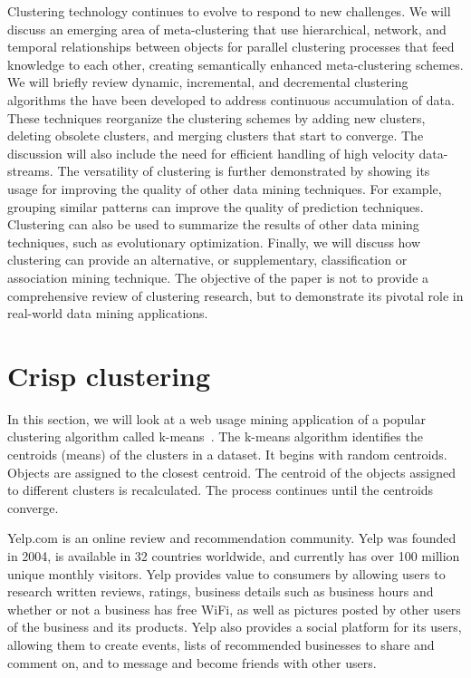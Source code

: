 \documentclass[oribibl]{llncs}
\begin{document}
Clustering technology continues to evolve to respond to new challenges. We will discuss an emerging area of meta-clustering that use hierarchical, network, and temporal relationships between objects for parallel clustering processes that feed knowledge to each other, creating semantically enhanced meta-clustering schemes. We will briefly review dynamic, incremental, and decremental clustering algorithms the have been developed to address continuous accumulation of data. These techniques reorganize the clustering schemes by adding new clusters, deleting obsolete clusters, and merging clusters that start to converge. The discussion will also include the need for efficient handling of high velocity data-streams. The versatility of clustering is further demonstrated by showing its usage for improving the quality of other data mining techniques. For example, grouping similar patterns can improve the quality of prediction techniques. Clustering can also be used to summarize the results of other data mining techniques, such as evolutionary optimization. Finally, we will discuss how clustering can provide an alternative, or supplementary, classification or association mining technique. The objective of the paper is not to provide a comprehensive review of clustering research, but to demonstrate its pivotal role in real-world data mining applications.

\section{Crisp clustering}
In this section, we will look at a web usage mining application of a popular clustering algorithm called k-means~\cite{HartiganWong1979}.
The k-means algorithm identifies the centroids (means) of the clusters in a dataset. It begins with random centroids. Objects are assigned to the closest centroid. The centroid of the objects assigned to different clusters is recalculated. The process continues until the centroids converge.

Yelp.com is an online review and recommendation community.  
Yelp was founded in 2004, is available in 32 countries worldwide, and currently has over 100 million unique monthly visitors.  Yelp provides value to consumers by allowing users to research written reviews, ratings, business details such as business hours and whether or not a business has free WiFi, as well as pictures posted by other users of the business and its products.  Yelp also provides a social platform for its users, allowing them to create events, lists of recommended businesses to share and comment on, and to message and become friends with other users.
\end{document}
